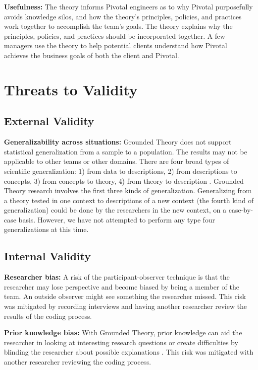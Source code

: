 \textbf{Usefulness:} The theory informs Pivotal engineers as to why Pivotal purposefully avoids knowledge silos, and how the theory's principles, policies, and practices work together to accomplish the team's goals. The theory explains why the principles, policies, and practices should be incorporated together. A few managers use  the theory to help potential clients understand how Pivotal achieves the business goals of both the client and Pivotal.

\section{Threats to Validity}

\subsection{External Validity}

\textbf{Generalizability across situations:} Grounded Theory does not support statistical generalization from a sample to a population. The results may not be applicable to other teams or other domains. There are four broad types of scientific generalization: 1) from data to descriptions, 2) from descriptions to concepts, 3) from concepts to theory, 4) from theory to description \cite{Lee2003generalizing}. Grounded Theory research involves the first three kinds of generalization. Generalizing from a theory tested in one context to descriptions of a new context (the fourth kind of generalization) could be done by the researchers in the new context, on a case-by-case basis. However, we have not attempted to perform any type four generalizations at this time.

\subsection{Internal Validity}
\textbf{Researcher bias:} A risk of the participant-observer technique is that the researcher may lose perspective and become biased by being a member of the team. An outside observer might see something the researcher missed. This risk was mitigated by recording interviews and having another researcher review the results of the coding process.

\textbf{Prior knowledge bias:} With Grounded Theory, prior knowledge can aid the researcher in looking at interesting research questions or create difficulties by blinding the researcher about possible explanations \cite{GlaserIssues}. This risk was mitigated with another researcher reviewing the coding process. 

